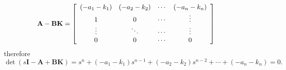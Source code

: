 \[
{\bf{A}} - {\bf{BK}}  =  \left[ {\begin{array}{*{20}c}
	   {( - a_1  - k_1 )} & {( - a_2  - k_2 )} &  \cdots  & {( - a_n  - k_n )}  \\
	   1 & 0 &  \cdots  &  \vdots   \\
	    \vdots  &  \ddots  &  \cdots  &  \vdots   \\
	   0 & 0 &  \cdots  & 0  \\
	\end{array}} \right]
\]
therefore
\begin{equation}
	\label{eq:5}
	\det(s\mathbf{I}-\mathbf{A}+\mathbf{BK}) = s^n + ( - a_1  - k_1 )s^{n-1} + ( - a_2  - k_2 )s^{n-2} + \cdots +  ( - a_n  - k_n ) = 0.
\end{equation}

\endinput

